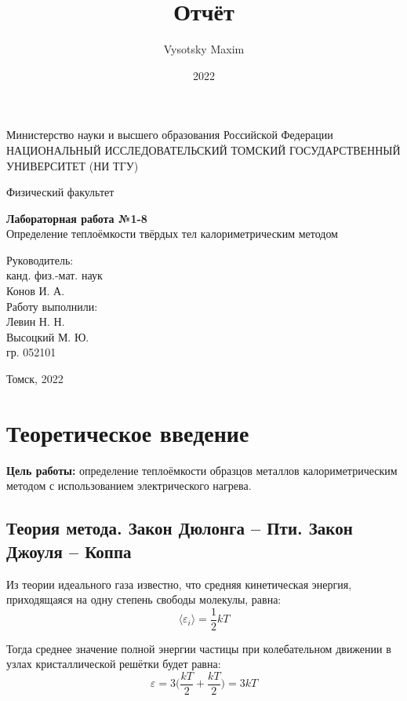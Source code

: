 \documentclass[a4paper,12pt]{article}
\author{Vysotsky Maxim}
\title{Отчёт}
\date{2022}
\begin{document}
	\begin{titlepage}
		\begin{center}
			{Министерство науки и высшего образования Российской Федерации
				НАЦИОНАЛЬНЫЙ ИССЛЕДОВАТЕЛЬСКИЙ ТОМСКИЙ
				ГОСУДАРСТВЕННЫЙ УНИВЕРСИТЕТ (НИ ТГУ)}
		\end{center}
		\begin{center}
			{Физический факультет}
		\end{center}
		
		
		\vspace{8cm}
		{
			\begin{center}
				{\bf Лабораторная работа №1-8}\\
				Определение теплоёмкости твёрдых тел калориметрическим методом
			\end{center}
		}
		\vspace{2cm}
		\begin{flushright}
			{Руководитель:\\ канд. физ.-мат. наук\\
				Конов И. А. \\
				Работу выполнили:\\
				Левин Н. Н. \\
				Высоцкий М. Ю.\\
				\vspace{0.2cm}
				гр. 052101}
		\end{flushright}
		\vspace{3cm}
		\begin{center}
			Томск, 2022
		\end{center}
	\end{titlepage}

\section{Теоретическое введение}
\textbf{Цель работы:} определение теплоёмкости образцов металлов калориметрическим методом с  использованием электрического нагрева.

\subsection{Теория метода. Закон Дюлонга -- Пти. Закон Джоуля -- Коппа}
\hspace{\parindent}Из теории идеального газа известно, что средняя кинетическая энергия, приходящаяся на одну степень свободы молекулы, равна:
$$ \langle \varepsilon_i \rangle = \frac{1}{2}kT$$

Тогда среднее значение полной энергии частицы при колебательном движении в узлах кристаллической решётки будет равна:
$$ \varepsilon = 3\bigg(\frac{kT}{2} + \frac{kT}{2}\bigg) = 3kT$$
\end{document}
